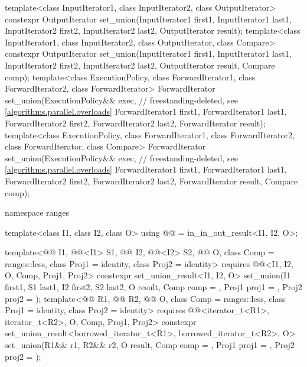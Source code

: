 \begin{codeblock}
{  template<class InputIterator1, class InputIterator2, class OutputIterator>
    constexpr OutputIterator
      set_union(InputIterator1 first1, InputIterator1 last1,
                InputIterator2 first2, InputIterator2 last2,
                OutputIterator result);
  template<class InputIterator1, class InputIterator2, class OutputIterator, class Compare>
    constexpr OutputIterator
      set_union(InputIterator1 first1, InputIterator1 last1,
                InputIterator2 first2, InputIterator2 last2,
                OutputIterator result, Compare comp);
  template<class ExecutionPolicy, class ForwardIterator1, class ForwardIterator2,
           class ForwardIterator>
    ForwardIterator
      set_union(ExecutionPolicy&& exec,                         // freestanding-deleted, see \ref{algorithms.parallel.overloads}
                ForwardIterator1 first1, ForwardIterator1 last1,
                ForwardIterator2 first2, ForwardIterator2 last2,
                ForwardIterator result);
  template<class ExecutionPolicy, class ForwardIterator1, class ForwardIterator2,
           class ForwardIterator, class Compare>
    ForwardIterator
      set_union(ExecutionPolicy&& exec,                         // freestanding-deleted, see \ref{algorithms.parallel.overloads}
                ForwardIterator1 first1, ForwardIterator1 last1,
                ForwardIterator2 first2, ForwardIterator2 last2,
                ForwardIterator result, Compare comp);

  namespace ranges {
    template<class I1, class I2, class O>
      using @@ = in_in_out_result<I1, I2, O>;

    template<@@ I1, @@<I1> S1, @@ I2, @@<I2> S2,
             @@ O, class Comp = ranges::less,
             class Proj1 = identity, class Proj2 = identity>
      requires @@<I1, I2, O, Comp, Proj1, Proj2>
      constexpr set_union_result<I1, I2, O>
        set_union(I1 first1, S1 last1, I2 first2, S2 last2, O result, Comp comp = {},
                  Proj1 proj1 = {}, Proj2 proj2 = {});
    template<@@ R1, @@ R2, @@ O,
             class Comp = ranges::less, class Proj1 = identity, class Proj2 = identity>
      requires @@<iterator_t<R1>, iterator_t<R2>, O, Comp, Proj1, Proj2>
      constexpr set_union_result<borrowed_iterator_t<R1>, borrowed_iterator_t<R2>, O>
        set_union(R1&& r1, R2&& r2, O result, Comp comp = {},
                  Proj1 proj1 = {}, Proj2 proj2 = {});

}}
\end{codeblock}
